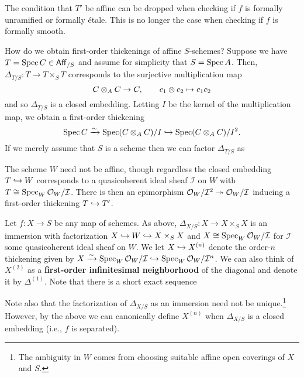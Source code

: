 \documentclass[11pt]{article}
\newcommand{\I}{\mathcal{I}}
\begin{document}
\begin{remark}
The condition that $T'$ be affine can be dropped when checking if $f$ is formally unramified or formally \'{e}tale. This is no longer the case when checking if $f$ is formally smooth.
\end{remark}

How do we obtain first-order thickenings of affine $S$-schemes? Suppose we have $T=\operatorname{Spec} C\in\operatorname{\mathsf{Aff}}_{/S}$ and assume for simplicity that $S=\operatorname{Spec} A$. Then, $\Delta_{T/S}: T\to T\times_ST$ corresponds to the surjective multiplication map 
$$C\otimes_AC\to C,\qquad c_1\otimes c_2\mapsto c_1c_2$$
and so $\Delta_{T/S}$ is a closed embedding. Letting $I$ be the kernel of the multiplication map, we obtain a first-order thickening 
$$\operatorname{Spec} C\xrightarrow{\sim}\operatorname{Spec}(C\otimes_AC)/I\hookrightarrow\operatorname{Spec}(C\otimes_AC)/I^2.$$
If we merely assume that $S$ is a scheme then we can factor $\Delta_{T/S}$ as 
\begin{center}
\end{center}
The scheme $W$ need not be affine, though regardless the closed embedding $T\hookrightarrow W$ corresponds to a quasicoherent ideal sheaf $\I$ on $W$ with $T\iso\Spec_W\O_W/\I$. There is then an epimorphism $\O_W/\I^2\surj\O_W/\I$ inducing a first-order thickening $T\hookrightarrow T'$. 

Let $f: X\to S$ be any map of schemes. As above, $\Delta_{X/S}: X\to X\times_SX$ is an immersion with factorization $X\hookrightarrow W\hookrightarrow X\times_SX$ and $X\iso\Spec_W\O_W/\I$ for $\I$ some quasicoherent ideal sheaf on $W$. We let $X\hookrightarrow X^{(n)}$ denote the order-$n$ thickening given by $X\xto{\sim}\Spec_W\O_W/\I\inj\Spec_W\O_W/\I^n$. We can also think of $X^{(2)}$ as a \textbf{first-order infinitesimal neighborhood} of the diagonal and denote it by $\Delta^{(1)}$. Note that there is a short exact sequence
\begin{center}
\end{center}
Note also that the factorization of $\Delta_{X/S}$ as an immersion need not be unique.\footnote{The ambiguity in $W$ comes from choosing suitable affine open coverings of $X$ and $S$.} However, by the above we can canonically define $X^{(n)}$ when $\Delta_{X/S}$ is a closed embedding (i.e., $f$ is separated).
\end{document}
